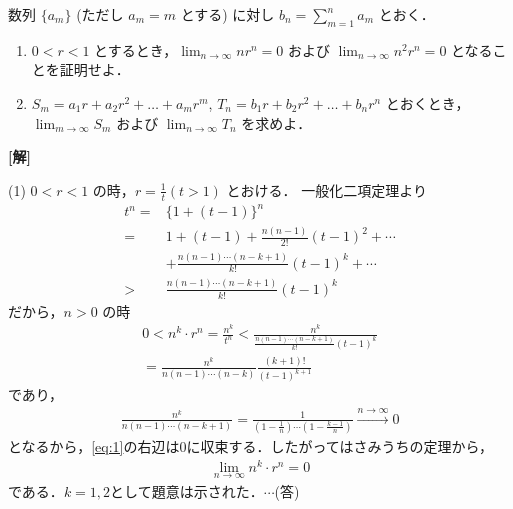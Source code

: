 \documentclass[a4paper,10pt]{ltjsarticle}
\begin{document}
\begin{oframed}
  数列 $\{a_m\}$ (ただし $a_m = m$ とする) に対し $\displaystyle b_n = \sum_{m=1}^{n} a_m$ とおく．
  \begin{enumerate}
    \item $0 < r < 1$ とするとき，$\displaystyle \lim_{n \to \infty} nr^n = 0$ および $\displaystyle \lim_{n \to \infty} n^2r^n = 0$ となることを証明せよ．
    \item $S_m = a_1r + a_2r^2 + \dots + a_mr^m$, $T_n = b_1r + b_2r^2 + \dots + b_nr^n$ とおくとき，
          $\displaystyle \lim_{m \to \infty} S_m$ および $\displaystyle \lim_{n \to \infty} T_n$ を求めよ．
  \end{enumerate}
\end{oframed}
\setlength{\columnseprule}{0.4pt}
\begin{multicols}{2}
  {\bf[解]}

  (1)
  $0 < r < 1$ の時，$r = \frac{1}{t} (t>1)$ とおける．
  一般化二項定理より
  \begin{align*}
    t^n
    = & \{1+(t-1)\}^n                                  \\
    = & 1 + (t-1) + \frac{n(n-1)}{2!}(t-1)^2+\cdots    \\
      & +\frac{n(n-1)\cdots(n-k+1)}{k!}(t-1)^k +\cdots \\
    > & \frac{n(n-1)\cdots(n-k+1)}{k!}(t-1)^k
  \end{align*}
  だから，$n > 0$ の時
  \begin{align}
    0 < n^k \cdot r^n = \frac{n^k}{t^n} < \frac{n^k}{\frac{n(n-1)\cdots(n-k+1)}{k!}(t-1)^k} \nonumber \\
    = \frac{n^k}{n(n-1)\cdots(n-k)}\frac{(k+1)!}{(t-1)^{k+1}}\label{eq:1}
  \end{align}
  であり，
  \begin{align*}
    \frac{n^k }{n(n-1)\cdots(n-k+1)} = \frac{1}{\left(1-\frac{1}{n}\right)\cdots\left(1-\frac{k-1}{n}\right) } \xrightarrow{n\to\infty} 0
  \end{align*}
  となるから，\cref{eq:1}の右辺は$0$に収束する．したがってはさみうちの定理から，
  \begin{align*}
    \lim_{n\to\infty} n^k \cdot r^n = 0
  \end{align*}
  である．$k=1,2$として題意は示された．$\cdots$(答)


\end{multicols}
\end{document}
